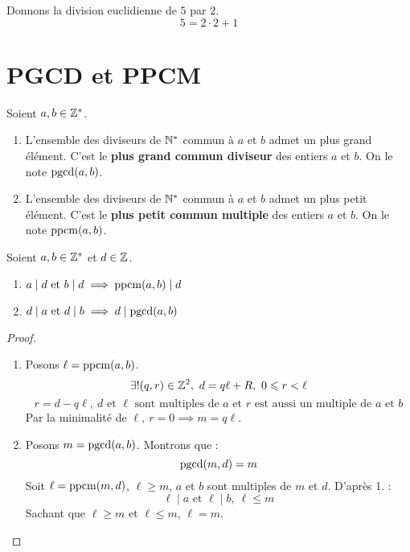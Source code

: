 \begin{example}
	Donnons la division euclidienne de $5$ par $2$.
	\[ 5 = 2 \cdot 2 + 1 \]
\end{example}

\section{PGCD et PPCM}

\begin{definition}
	Soient $a, b \in \mathbb{Z}^*$. 
	\begin{enumerate}
		\item L'ensemble des diviseurs de $\mathbb{N}^*$ commun à $a$ et $b$ admet un plus grand élément. C'est le \textbf{plus grand commun diviseur} des entiers $a$ et $b$. On le note $\operatorname{pgcd}(a, b)$.
		\item L'ensemble des diviseurs de $\mathbb{N}^*$ commun à $a$ et $b$ admet un plus petit élément. C'est le \textbf{plus petit commun multiple} des entiers $a$ et $b$. On le note $\operatorname{ppcm}(a, b)$.
	\end{enumerate}
\end{definition}

\begin{theorem}
	Soient $a, b \in \mathbb{Z}^*$ et $d \in \mathbb{Z}$.
	\begin{enumerate}
		\item $a \mid d \text{ et } b \mid d \implies \operatorname{ppcm}(a, b) \mid d$
		\item $d \mid a \text{ et } d \mid b \implies d \mid \operatorname{pgcd}(a, b)$
	\end{enumerate}
\end{theorem}

\begin{proof}
	\leavevmode
	\begin{enumerate}
		\item Posons $\ell = \operatorname{ppcm}(a,b)$. 
		\[ \exists ! (q,r) \in \Z^2,\ d = q \ell + R,\ 0 \leq r < \ell \]
		\[ r = d - q \ell,\ d \text{ et } \ell \text{ sont multiples de } a \text{ et } r \text{ est aussi un multiple de } a \text{ et } b \]
		Par la minimalité de $\ell,\ r = 0 \implies m = q \ell$.
		\item Posons $m = \operatorname{pgcd}(a, b)$. Montrons que :
		\[ \operatorname{pgcd}(m, d) = m \]
		Soit $\ell = \operatorname{ppcm}(m,d)$, $\ell \geq m$, $a$ et $b$ sont multiples de $m$ et $d$. D'après 1. :
		\[ \ell \mid a \text{ et } \ell \mid b,\ \ell \leq m \]
		Sachant que $\ell \geq m$ et $\ell \leq m$, $\ell = m$.
	\end{enumerate}
\end{proof}

